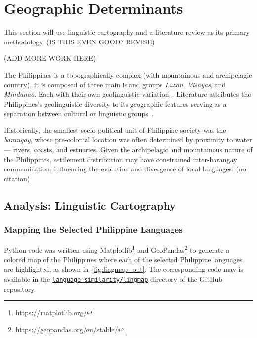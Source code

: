 \section{Geographic Determinants}

This section will use linguistic cartography and a literature review as its
primary methodology. \todo (IS THIS EVEN GOOD? REVISE)

\todo (ADD MORE WORK HERE)

The Philippines is a topographically complex (with mountainous and archipelagic
country), it is composed of three main island groups \emph{Luzon},
\emph{Visayas}, and \emph{Mindanao}. Each with their own geolinguistic
variation~\cite{Boquet_2017}. Literature attributes the Philippines's
geolinguistic diversity to its geographic features serving as a separation
between cultural or linguistic groups~\cite{Blust_1991}.

Historically, the smallest socio-political unit of Philippine society was the
\emph{barangay}, whose pre-colonial location was often determined by proximity
to water — rivers, coasts, and estuaries. Given the archipelagic and
mountainous nature of the Philippines, settlement distribution may have
constrained inter-barangay communication, influencing the evolution and
divergence of local languages. \todo (no citation)

\subsection{Analysis: Linguistic Cartography}

\subsubsection{Mapping the Selected Philippine Languages}

Python code was written using
Matplotlib\footnote{\url{https://matplotlib.org/}} and
GeoPandas\footnote{\url{https://geopandas.org/en/stable/}} to generate a
colored map of the Philippines where each of the selected Philippine languages
are highlighted, as shown in~\cref{fig:lingmap_out}. The corresponding code may
is available in the
\href{https://github.com/zrygan/nlp/tree/master/language_similarity/lingmap}{\texttt{language\_similarity/lingmap}}
directory of the GitHub repository.

